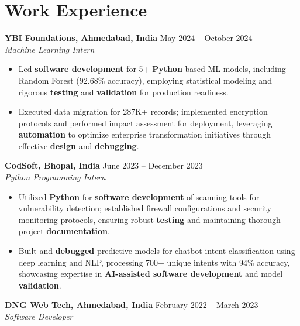 \documentclass[a4paper,10pt]{article}
\begin{document}
\section*{Work Experience}
\textbf{YBI Foundations, Ahmedabad, India} \hfill May 2024 -- October 2024\\
\textit{Machine Learning Intern} \\
\begin{itemize}[leftmargin=*, itemsep=0pt, parsep=1pt]
\vspace{-6mm}
\item Led \textbf{software development} for 5+ \textbf{Python}-based ML models, including Random Forest (92.68\% accuracy), employing statistical modeling and rigorous \textbf{testing} and \textbf{validation} for production readiness.
\item Executed data migration for 287K+ records; implemented encryption protocols and performed impact assessment for deployment, leveraging \textbf{automation} to optimize enterprise transformation initiatives through effective \textbf{design} and \textbf{debugging}.
\end{itemize}
\textbf{CodSoft, Bhopal, India} \hfill June 2023 -- December 2023\\
\textit{Python Programming Intern} \\
\begin{itemize}[leftmargin=*, itemsep=0pt, parsep=1pt]
\vspace{-6mm}
\item Utilized \textbf{Python} for \textbf{software development} of scanning tools for vulnerability detection; established firewall configurations and security monitoring protocols, ensuring robust \textbf{testing} and maintaining thorough project \textbf{documentation}.
\item Built and \textbf{debugged} predictive models for chatbot intent classification using deep learning and NLP, processing 700+ unique intents with 94\% accuracy, showcasing expertise in \textbf{AI-assisted software development} and model \textbf{validation}.
\vspace{-1mm}
\end{itemize}

\textbf{DNG Web Tech, Ahmedabad, India} \hfill February 2022 -- March 2023 \\
\textit{Software Developer} \\
\end{document}
